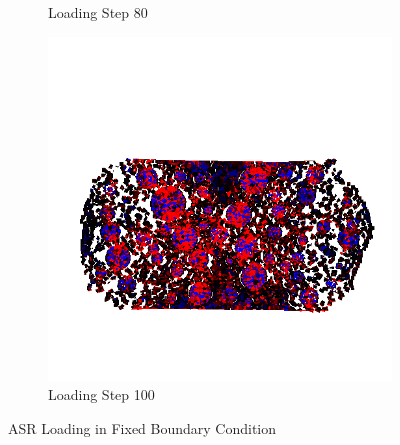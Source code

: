 \begin{figure}[ht]
\begin{subfigure}{.33\textwidth}
      \caption{Loading Step 80}
      \end{subfigure}%
      \begin{subfigure}{.33\textwidth}
        \centering
        \includegraphics[width=1.0\linewidth]{Files/A30P75_3_IS/DEP50-STEP(120).png}
        \caption{Loading Step 100}
      \end{subfigure}
  
  \caption{ASR Loading in Fixed Boundary Condition}
  \label{fig:ASR_Loading}
\end{figure}

